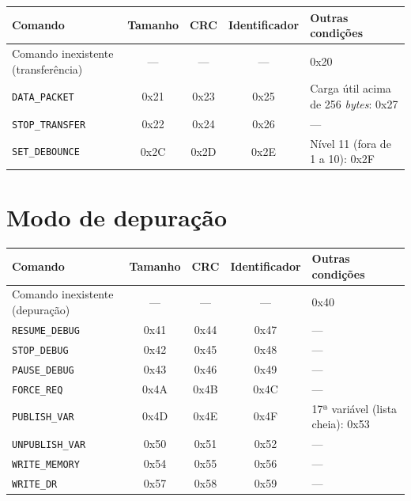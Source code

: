 \begin{quadrofixo}
    \centering
    \small
    \begin{tabular}{|p{4.6cm}|c|c|c|p{3.6cm}|}
        \hline
        Comando & Tamanho & CRC & Identificador & Outras condições \\
        \hline
        Comando inexistente (transferência) & --- & --- & --- & 0x20 \\
        \hline
        \texttt{DATA\_PACKET} & 0x21 & 0x23 & 0x25 & Carga útil acima de 256 \textit{bytes}: 0x27 \\
        \hline
        \texttt{STOP\_TRANSFER} & 0x22 & 0x24 & 0x26 & --- \\
        \hline
        \texttt{SET\_DEBOUNCE} & 0x2C & 0x2D & 0x2E & Nível 11 (fora de 1 a 10): 0x2F \\
        \hline
    \end{tabular}

    \label{qua:ape-i2-transferencia}
\end{quadrofixo}

\section{Modo de depuração}
\label{sec:ape-i2-depuracao}

\begin{quadrofixo}
    \centering
    \small
    \begin{tabular}{|p{4.6cm}|c|c|c|p{3.6cm}|}
        \hline
        Comando & Tamanho & CRC & Identificador & Outras condições \\
        \hline
        Comando inexistente (depuração) & --- & --- & --- & 0x40 \\
        \hline
        \texttt{RESUME\_DEBUG} & 0x41 & 0x44 & 0x47 & --- \\
        \hline
        \texttt{STOP\_DEBUG} & 0x42 & 0x45 & 0x48 & --- \\
        \hline
        \texttt{PAUSE\_DEBUG} & 0x43 & 0x46 & 0x49 & --- \\
        \hline
        \texttt{FORCE\_REQ} & 0x4A & 0x4B & 0x4C & --- \\
        \hline
        \texttt{PUBLISH\_VAR} & 0x4D & 0x4E & 0x4F & 17ª variável (lista cheia): 0x53 \\
        \hline
        \texttt{UNPUBLISH\_VAR} & 0x50 & 0x51 & 0x52 & --- \\
        \hline
        \texttt{WRITE\_MEMORY} & 0x54 & 0x55 & 0x56 & --- \\
        \hline
        \texttt{WRITE\_DR} & 0x57 & 0x58 & 0x59 & --- \\
        \hline
    \end{tabular}

    \label{qua:ape-i2-depuracao}
\end{quadrofixo}

